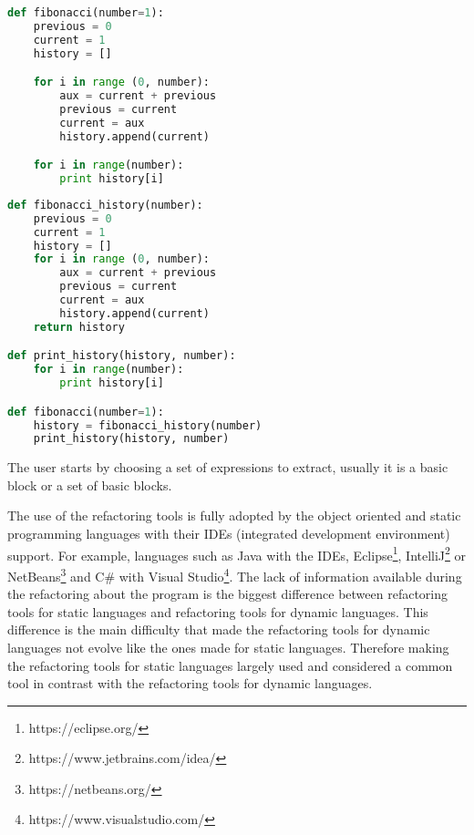 \begin{lstlisting}[frame=single, caption=Fibonacci function first implementation, language=Python]
def fibonacci(number=1):
	previous = 0
	current = 1
	history = []

	for i in range (0, number):
		aux = current + previous
		previous = current
		current = aux
		history.append(current)

	for i in range(number):
		print history[i]
\end{lstlisting}


\begin{lstlisting}[frame=single, caption=Fibonacci function after using extract function, language=Python]
def fibonacci_history(number):
	previous = 0
	current = 1
	history = []
	for i in range (0, number):
		aux = current + previous
		previous = current
		current = aux
		history.append(current)
	return history

def print_history(history, number):
	for i in range(number):
		print history[i]

def fibonacci(number=1):
	history = fibonacci_history(number)
	print_history(history, number)
\end{lstlisting}


The user starts by choosing a set of expressions to extract, usually it is a  basic block or a set of basic blocks. 

The use of the refactoring tools is fully adopted by the object oriented and static programming languages with their IDEs (integrated development environment) support.
For example, languages such as Java with the IDEs, Eclipse\footnote{https://eclipse.org/}, IntelliJ\footnote{https://www.jetbrains.com/idea/} or NetBeans\footnote{https://netbeans.org/} and C\# with Visual Studio\footnote{https://www.visualstudio.com/}.
The lack of information available during the refactoring about the program is the biggest difference between refactoring tools for static languages and refactoring tools for dynamic languages.
This difference is the main difficulty that made the refactoring tools for dynamic languages not evolve like the ones made for static languages. 
Therefore making the refactoring tools for static languages largely used and considered a common tool in contrast with the refactoring tools for dynamic languages.  %

